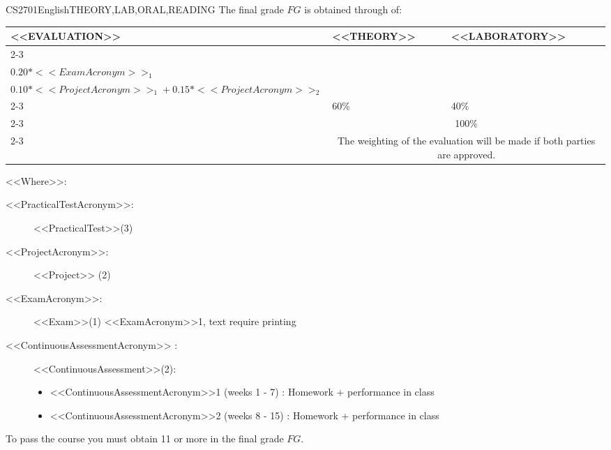    
  \begin{evaluation}{CS2701}{English}{THEORY,LAB,ORAL,READING}
  The final grade $FG$ is obtained through of:
 
  \begin{tabularx}{0.9\textwidth}{|X|p{}|p{}|} \hline
  \multirow{4}{*}{\uppercase{<<Evaluation>>}} & \uppercase{<<Theory>>} & \uppercase{<<Laboratory>>} \\ \cline{2-3}
  & %
      \begin{minipage}{0.95\textwidth}
      \begin{tabular}{l}
          $0.12*<<PracticalTestAcronym>>_{1} + 0.14*<<PracticalTestAcronym>>_{2} + 0.14*<<PracticalTestAcronym>>_{3}$ + \\  
          $0.20*<<ExamAcronym>>_{1}$
      \end{tabular} 
      \end{minipage} 
  & %
      \begin{minipage}{0.95\textwidth}
      \begin{tabular}{l}
          $0.07*<<ContinuousAssessmentAcronym>>_{1} + 0.08*<<ContinuousAssessmentAcronym>>_{2}$  +\\
          $0.10*<<ProjectAcronym>>_{1} + 0.15*<<ProjectAcronym>>_{2}$
          \end{tabular} 
      \end{minipage}                 \\ \cline{2-3}
  
  & %
  60\% 
  & %
  40\% \\ \cline{2-3}
  & \multicolumn{2}{|c|}{100\%}  \\ \cline{2-3}
  & \multicolumn{2}{|c|}{The weighting of the evaluation will be made if both parties are approved.}  \\ \hline
  \end{tabularx}
  
  \vspace{2mm}
  \noindent <<Where>>:
  \begin{description}
    \item[<<PracticalTestAcronym>>:] <<PracticalTest>>(3)
    \item[<<ProjectAcronym>>:] <<Project>> (2)  
    \item[<<ExamAcronym>>:] <<Exam>>(1) <<ExamAcronym>>1, text require printing
    \item[<<ContinuousAssessmentAcronym>> :] <<ContinuousAssessment>>(2):
     \begin{itemize}
            \item  <<ContinuousAssessmentAcronym>>1 (weeks 1 - 7) : Homework + performance in class
            \item <<ContinuousAssessmentAcronym>>2 (weeks 8 - 15) :  Homework + performance in class
      \end{itemize}
  \end{description}

    \noindent To pass the course you must obtain 11 or more in the final grade $FG$.
    \end{evaluation}
 

